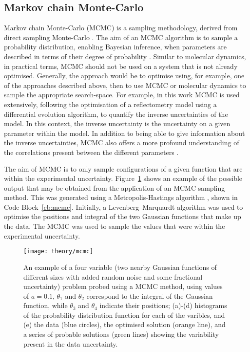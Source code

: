 \subsection{Markov chain Monte-Carlo}
\label{sec:mcmc}
Markov chain Monte-Carlo (MCMC) is a sampling methodology, derived from direct sampling Monte-Carlo \cite{krauth_statistical_2006}.
The aim of an MCMC algorithm is to sample a probability distribution, enabling Bayesian inference, when parameters are described in terms of their degree of probability \cite{sivia_data_2006}.
Similar to molecular dynamics, in practical terms, MCMC should not be used on a system that is not already optimised.
Generally, the approach would be to optimise using, for example, one of the approaches described above, then to use MCMC or molecular dynamics to sample the appropriate search-space.
For example, in this work MCMC is used extensively, following the optimisation of a reflectometry model using a differential evolution algorithm, to quantify the inverse uncertainties of the model.
In this context, the inverse uncertainty is the uncertainty on a given parameter within the model.
In addition to being able to give information about the inverse uncertainties, MCMC also offers a more profound understanding of the correlations present between the different parameters \cite{gilks_markov_1995}.

The aim of MCMC is to only sample configurations of a given function that are within the experimental uncertainty.
Figure~\ref{fig:mcmc} shows an example of the possible output that may be obtained from the application of an MCMC sampling method.
This was generated using a Metropolis-Hastings algorithm \cite{metropolis_equation_1953,hastings_monte_1970}, shown in Code Block~\ref{cb:mcmc}.
Initially, a Levenberg–Marquardt algorithm \cite{levenberg_method_1944,marquardt_algorithm_1963} was used to optimise the positions and integral of the two Gaussian functions that make up the data.
The MCMC was used to sample the values that were within the experimental uncertainty.
%
\begin{figure}
    \centering
    \texttt{[image: theory/mcmc]}
    \caption{An example of a four variable (two nearby Gaussian functions of different sizes with added random noise and some fractional uncertainty) problem probed using a MCMC method, using values of $a=0.1$, $\theta_1$ and $\theta_2$ correspond to the integral of the Gaussian function, while $\theta_3$ and $\theta_4$ indicate their positions; (a)-(d) histograms of the probability distribution function for each of the varibles, and (e) the data (blue circles), the optimised solution (orange line), and a series of probable solutions (green lines) showing the variability present in the data uncertainty.}
    \label{fig:mcmc}
\end{figure}
%
\begin{figure}
    \centering
        
\end{figure}
%

